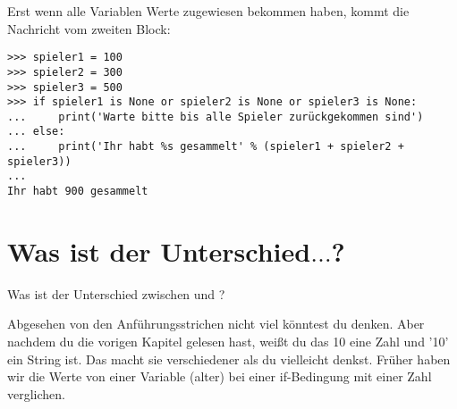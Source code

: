 \noindent
Erst wenn alle Variablen Werte zugewiesen bekommen haben, kommt die Nachricht vom zweiten Block:

\begin{Verbatim}[frame=single]
>>> spieler1 = 100
>>> spieler2 = 300
>>> spieler3 = 500
>>> if spieler1 is None or spieler2 is None or spieler3 is None:
...     print('Warte bitte bis alle Spieler zurückgekommen sind')
... else:
...     print('Ihr habt %s gesammelt' % (spieler1 + spieler2 + spieler3))
...
Ihr habt 900 gesammelt
\end{Verbatim}

\section{Was ist der Unterschied\texorpdfstring{$\ldots$}{...}?}\label{whatsthedifference}

Was ist der Unterschied zwischen  und ?
\par
Abgesehen von den Anführungsstrichen nicht viel könntest du denken.  Aber nachdem du die vorigen Kapitel gelesen hast, weißt du das 10 eine Zahl und '10' ein String ist. Das macht sie verschiedener als du vielleicht denkst. Früher haben wir die Werte von einer Variable (alter) bei einer if-Bedingung mit einer Zahl verglichen.

